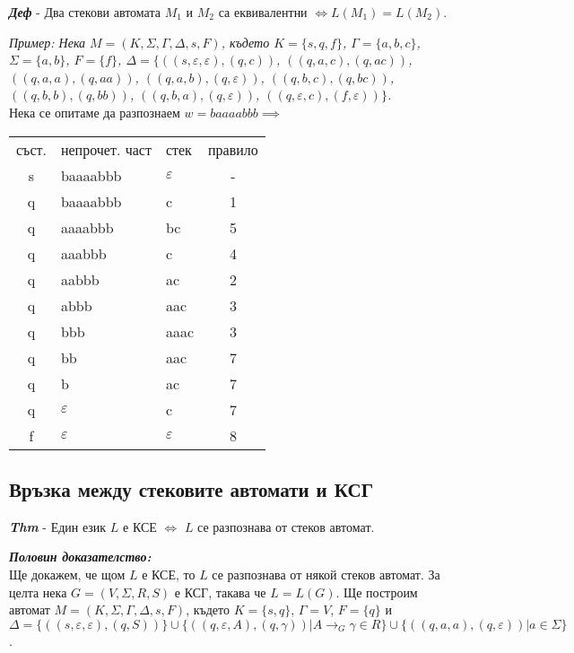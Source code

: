 \documentclass[fleqn,12pt]{article}
\begin{document}
\begin{flushleft}
\textit{\textbf{Деф}} - Два стекови автомата $M_1$ и $M_2$ са еквивалентни $\iff L(M_1) = L(M_2)$.

\textit{Пример: Нека $M = (K, \Sigma, \Gamma, \Delta, s, F)$, където $K = \{s, q, f\}$, $\Gamma = \{a, b, c\}$, $\Sigma = \{a, b\}$, $F = \{f\}$, $\Delta = \{$$((s, \varepsilon, \varepsilon), (q, c))$, $((q, a, c), (q, ac))$, $((q, a, a), (q, aa))$, $((q, a, b), (q, \varepsilon))$, $((q, b, c), (q, bc))$, $((q, b, b), (q, bb))$, $((q, b, a), (q, \varepsilon))$, $((q, \varepsilon, c), (f, \varepsilon))$$\}$.} \\

Нека се опитаме да разпознаем $w = baaaabbb \implies$

\begin{tabular}{ |c|l|l|c| } 
 \hline
 съст. & непрочет. част & стек & правило \\ 
 s & baaaabbb & $\varepsilon$ & - \\
 q & baaaabbb & c & 1 \\
 q & aaaabbb & bc & 5 \\
 q & aaabbb & c & 4 \\
 q & aabbb & ac & 2 \\
 q & abbb & aac & 3 \\
 q & bbb & aaac & 3 \\
 q & bb & aac & 7 \\
 q & b & ac & 7 \\
 q & $\varepsilon$ & c & 7 \\
 f & $\varepsilon$ & $\varepsilon$ & 8 \\
 \hline
\end{tabular}

\subsection{Връзка между стековите автомати и КСГ}

\textit{\textbf{Thm}} - Един език $L$ е КСЕ $\iff$ $L$ се разпознава от стеков автомат.

\textit{\textbf{Половин доказателство:}} \\

Ще докажем, че щом $L$ е КСЕ, то $L$ се разпознава от някой стеков автомат. За целта нека $G = (V, \Sigma, R, S)$ е КСГ, такава че $L = L(G)$. Ще построим автомат $M = (K, \Sigma, \Gamma, \Delta, s, F)$, където $K = \{s, q\}$, $\Gamma = V$, $F = \{q\}$ и $\Delta = \{((s, \varepsilon, \varepsilon), (q, S))\} \cup \{((q, \varepsilon, A), (q, \gamma)) | A \to_G \gamma \in R\} \cup \{((q, a, a), (q, \varepsilon)) | a \in \Sigma\}$.


\end{flushleft}
\end{document}
